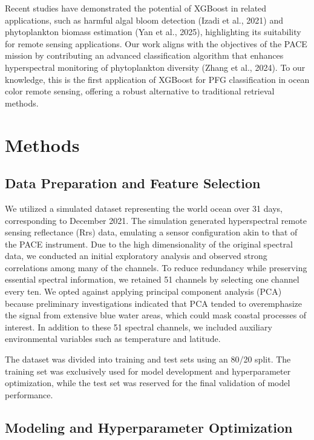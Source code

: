 \documentclass[
]{agujournal2019}
\begin{document}
Recent studies have demonstrated the potential of XGBoost in related
applications, such as harmful algal bloom detection (Izadi et al., 2021)
and phytoplankton biomass estimation (Yan et al., 2025), highlighting
its suitability for remote sensing applications. Our work aligns with
the objectives of the PACE mission by contributing an advanced
classification algorithm that enhances hyperspectral monitoring of
phytoplankton diversity (Zhang et al., 2024). To our knowledge, this is
the first application of XGBoost for PFG classification in ocean color
remote sensing, offering a robust alternative to traditional retrieval
methods.

\section{Methods}\label{methods}

\subsection{Data Preparation and Feature
Selection}\label{data-preparation-and-feature-selection}

We utilized a simulated dataset representing the world ocean over 31
days, corresponding to December 2021. The simulation generated
hyperspectral remote sensing reflectance (Rrs) data, emulating a sensor
configuration akin to that of the PACE instrument. Due to the high
dimensionality of the original spectral data, we conducted an initial
exploratory analysis and observed strong correlations among many of the
channels. To reduce redundancy while preserving essential spectral
information, we retained 51 channels by selecting one channel every ten.
We opted against applying principal component analysis (PCA) because
preliminary investigations indicated that PCA tended to overemphasize
the signal from extensive blue water areas, which could mask coastal
processes of interest. In addition to these 51 spectral channels, we
included auxiliary environmental variables such as temperature and
latitude.

The dataset was divided into training and test sets using an 80/20
split. The training set was exclusively used for model development and
hyperparameter optimization, while the test set was reserved for the
final validation of model performance.

\subsection{Modeling and Hyperparameter
Optimization}\label{modeling-and-hyperparameter-optimization}
\end{document}
